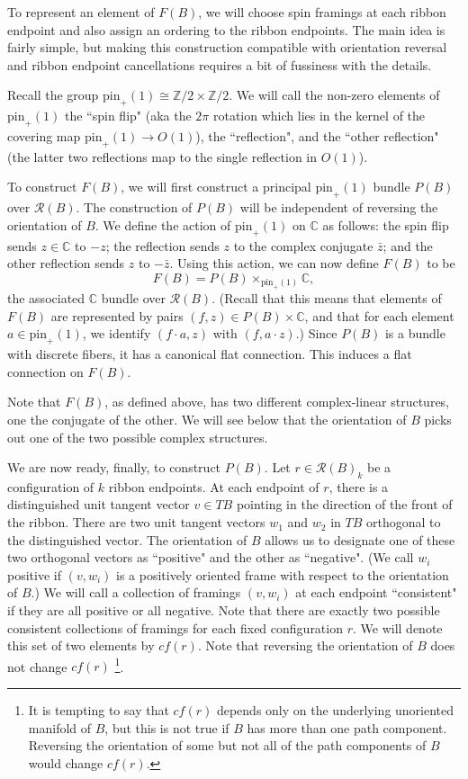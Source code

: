 \documentclass[12pt,a4paper]{article}
\newcommand{\zz}{\mathbb{Z}}
\newcommand{\cc}{\mathbb{C}}
\newcommand{\mcr}{\mathcal{R}}
\newcommand\be            {\begin{equation}}
\newcommand\ee            {\end{equation}}
\newcommand{\pin}{\text{pin}}
\begin{document}
\medskip

To represent an element of $F(B)$, we will choose spin framings at each ribbon endpoint and also assign
an ordering to the ribbon endpoints.
The main idea is fairly simple, but making this construction compatible with orientation reversal
and ribbon endpoint cancellations requires a bit of fussiness with the details.

\medskip

Recall the group $\pin_+(1) \cong \zz/2 \times \zz/2$.
We will call the non-zero elements of $\pin_+(1)$ the ``spin flip" (aka the $2\pi$ rotation which lies in the kernel of the covering map
$\pin_+(1) \to O(1)$), the ``reflection", and the ``other reflection"
(the latter two reflections map to the single reflection in $O(1)$).

To construct $F(B)$, we will first construct a principal $\pin_+(1)$ bundle $P(B)$ over $\mcr(B)$.
The construction of $P(B)$ will be independent of reversing the orientation of $B$.
We define the action of $\pin_+(1)$ on $\cc$ as follows:
the spin flip sends $z\in \cc$ to $-z$;
the reflection sends $z$ to the complex conjugate $\bar z$;
and the other reflection sends $z$ to $-\bar z$.
Using this action, we can now define $F(B)$ to be
\be \label{fermbundef}
	F(B) = P(B) \times_{\pin_+(1)} \cc ,
\ee
the associated $\cc$ bundle over $\mcr(B)$.
(Recall that this means that elements of $F(B)$ are represented by pairs $(f, z) \in P(B) \times \cc$,
and that for each element $a \in \pin_+(1)$, we identify $(f\cdot a, z)$ with $(f, a \cdot z)$.)
Since $P(B)$ is a bundle with discrete fibers, it has a canonical flat connection.
This induces a flat connection on $F(B)$.

Note that $F(B)$, as defined above, has two different complex-linear structures, one the conjugate of the other.
We will see below that the orientation of $B$ picks out one of the two possible complex structures.

\medskip

We are now ready, finally, to construct $P(B)$.
Let $r \in \mcr(B)_k$ be a configuration of $k$ ribbon endpoints.
At each endpoint of $r$, there is a distinguished unit tangent vector $v \in TB$
pointing in the direction of the front of the ribbon.
There are two unit tangent vectors $w_1$ and $w_2$ in $TB$ orthogonal to the distinguished vector.
The orientation of $B$ allows us to designate one of these two orthogonal vectors as ``positive"
and the other as ``negative".
(We call $w_i$ positive if $(v, w_i)$ is a positively oriented frame with respect to the orientation of $B$.)
We will call a collection of framings $(v, w_i)$ at each endpoint ``consistent" if they are all positive
or all negative.
Note that there are exactly two possible consistent collections of framings for each fixed configuration $r$.
We will denote this set of two elements by $cf(r)$.
Note that reversing the orientation of $B$ does not change $cf(r)$
\footnote{It is tempting to say that $cf(r)$ depends only on the underlying unoriented manifold of $B$, but this
is not true if $B$ has more than one path component.
Reversing the orientation of some but not all of the path components of $B$ would change $cf(r)$.}.
\end{document}
